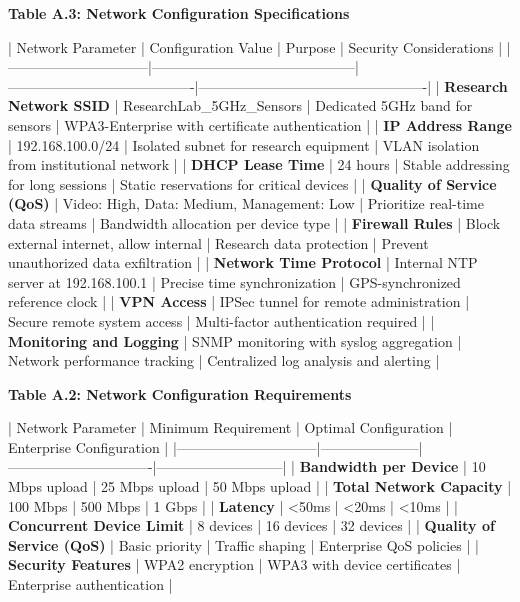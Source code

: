 \documentclass[11pt,a4paper]{article}
\begin{document}
\textbf{Table A.3: Network Configuration Specifications}

| Network Parameter            | Configuration Value                        | Purpose                                | Security Considerations                         |
|------------------------------|--------------------------------------------|----------------------------------------|-------------------------------------------------|
| \textbf{Research Network SSID}    | ResearchLab\_5GHz\_Sensors                   | Dedicated 5GHz band for sensors        | WPA3-Enterprise with certificate authentication |
| \textbf{IP Address Range}         | 192.168.100.0/24                           | Isolated subnet for research equipment | VLAN isolation from institutional network       |
| \textbf{DHCP Lease Time}          | 24 hours                                   | Stable addressing for long sessions    | Static reservations for critical devices        |
| \textbf{Quality of Service (QoS)} | Video: High, Data: Medium, Management: Low | Prioritize real-time data streams      | Bandwidth allocation per device type            |
| \textbf{Firewall Rules}           | Block external internet, allow internal    | Research data protection               | Prevent unauthorized data exfiltration          |
| \textbf{Network Time Protocol}    | Internal NTP server at 192.168.100.1       | Precise time synchronization           | GPS-synchronized reference clock                |
| \textbf{VPN Access}               | IPSec tunnel for remote administration     | Secure remote system access            | Multi-factor authentication required            |
| \textbf{Monitoring and Logging}   | SNMP monitoring with syslog aggregation    | Network performance tracking           | Centralized log analysis and alerting           |

\textbf{Table A.2: Network Configuration Requirements}

| Network Parameter            | Minimum Requirement | Optimal Configuration         | Enterprise Configuration  |
|------------------------------|---------------------|-------------------------------|---------------------------|
| \textbf{Bandwidth per Device}     | 10 Mbps upload      | 25 Mbps upload                | 50 Mbps upload            |
| \textbf{Total Network Capacity}   | 100 Mbps            | 500 Mbps                      | 1 Gbps                    |
| \textbf{Latency}                  | <50ms               | <20ms                         | <10ms                     |
| \textbf{Concurrent Device Limit}  | 8 devices           | 16 devices                    | 32 devices                |
| \textbf{Quality of Service (QoS)} | Basic priority      | Traffic shaping               | Enterprise QoS policies   |
| \textbf{Security Features}        | WPA2 encryption     | WPA3 with device certificates | Enterprise authentication |
\end{document}

